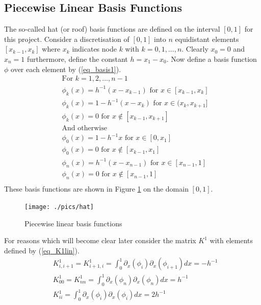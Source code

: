 \documentclass[11pt,fleqn]{article}
\theoremstyle{defstyle}
\begin{document}
\subsection{Piecewise Linear Basis Functions}
\label{section_plb}
The so-called hat (or roof) basis functions are defined on the interval $[0,1]$ for this project. Consider a discretisation of $[0,1]$ into $n$ equidistant elements $[x_{k-1}, x_k]$ where $x_k$ indicates node $k$ with $k=0,1,...,n$. Clearly $x_0=0$ and $x_n=1$ furthermore, define the constant $h = x_1-x_0$. Now define a basis function $\phi$ over each element by (\ref{eq_basis1}).  
\begin{equation}
\begin{aligned}
&\text{For } k=1,2,...,n-1 \\
&\phi_k(x) = h^{-1}(x-x_{k-1}) \text{ for } x \in [x_{k-1}, x_k] \\
&\phi_k(x) = 1-h^{-1}(x-x_{k}) \text{ for } x \in (x_{k}, x_{k+1}] \\
&\phi_k(x) = 0 \text{ for } x \notin [x_{k-1}, x_{k+1}] \\
&\text{And otherwise} \\
&\phi_0(x) = 1- h^{-1}x \text{ for } x \in [0, x_1] \\
&\phi_0(x) = 0 \text{ for } x \notin [x_{k-1}, x_1] \\
&\phi_n(x) = h^{-1}(x-x_{n-1}) \text{ for } x \in [x_{n-1}, 1] \\
&\phi_n(x) = 0 \text{ for } x \notin [x_{n-1}, 1] \\
\end{aligned}
\label{eq_basis1}
\end{equation}
These basis functions are shown in Figure \ref{fig_linbasis} on the domain $[0,1]$. 
\begin{figure}[H] 
\centering
\texttt{[image: ./pics/hat]}
\caption{Piecewise linear basis functions} 
\label{fig_linbasis}
\end{figure}
For reasons which will become clear later consider the matrix $K^1$ with elements defined by (\ref{eq_K1lin}).
\begin{equation}
\begin{aligned}
&K^1_{i,i+1}=K^1_{i+1,i}=\int^1_0 \partial_x(\phi_i)\partial_x(\phi_{i+1})dx = -h^{-1} \\
&K^1_{00} = K^1_{nn} = \int^1_0 \partial_x(\phi_n)\partial_x(\phi_{n})dx = h^{-1} \\
&K^1_{ii} = \int^1_0 \partial_x(\phi_i)\partial_x(\phi_{i})dx = 2h^{-1} \\
\end{aligned}
\label{eq_K1lin}
\end{equation}
\end{document}
